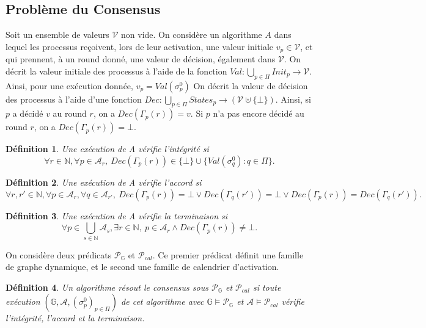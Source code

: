 \documentclass{article}
\newtheorem{definition}{Définition}
\begin{document}
\subsection{Problème du Consensus}

	Soit un ensemble de valeurs $\mathcal{V}$ non vide.
	On considère un algorithme $A$ dans lequel les processus reçoivent, lors de leur activation, une valeur initiale $v_p \in \mathcal{V}$,
	et qui prennent, à un round donné, une valeur de décision, également dans $\mathcal{V}$.
	On décrit la valeur initiale des processus à l'aide de la fonction $Val : \bigcup\limits_{p \in \Pi} Init_p  \rightarrow \mathcal{V}$.
	Ainsi, pour une exécution donnée, $v_p = Val(\sigma_p^0)$
	On décrit la valeur de décision des processus à l'aide d'une fonction
	$Dec : \bigcup\limits_{p \in \Pi} States_p  \rightarrow (\mathcal{V} \uplus \{\bot\})$.
	Ainsi, si $p$ a décidé $v$ au round $r$, on a $Dec(\Gamma_p(r)) = v$. Si $p$ n'a pas encore décidé au round $r$, on a $Dec(\Gamma_p(r)) = \bot$.

\begin{definition}
	Une exécution de A \emph{vérifie  l'intégrité} si 
	$$ \forall r \in \mathds{N},\forall p \in \mathcal{A}_{r}, \ Dec(\Gamma_p(r)) \in \{ \bot \} \cup  \{ Val(\sigma^0_q) :  q \in \Pi \}  .$$
\end{definition}

\begin{definition}
	Une exécution de A  \emph{vérifie l'accord} si
	$$\forall r, r'  \in \mathds{N}, \forall p \in \mathcal{A}_{r}, \forall q \in \mathcal{A}_{r'}, 
		\ Dec(\Gamma_p(r)) = \bot \vee Dec(\Gamma_q(r')) = \bot \vee Dec(\Gamma_p(r)) = Dec(\Gamma_q(r')) .$$
\end{definition}

\begin{definition}
	Une exécution de A \emph{vérifie la terminaison} si
	$$ \forall p \in \bigcup\limits_{s \in \mathds{N}} \mathcal{A}_s, \exists r \in \mathds{N}, \ 
		p \in \mathcal{A}_r \wedge Dec(\Gamma_p(r)) \neq \bot .  $$
\end{definition}

On considère deux prédicats $\mathcal{P}_{\mathds{G}}$ et $\mathcal{P}_{cal}$.
Ce premier prédicat définit une famille de graphe dynamique, et le second une famille de calendrier d'activation.
	
\begin{definition}\label{def:resforte}
	Un algorithme \emph{résout le consensus sous $\mathcal{P}_{\mathds{G}}$ et $\mathcal{P}_{cal}$} si toute exécution 
	$( \mathds{G} ,  \mathcal{A} , (\sigma^0_p)_{p \in \Pi})$    de cet algorithme
	avec $ \mathds{G} \models \mathcal{P}_{\mathds{G}}$ et $\mathcal{A}	\models \mathcal{P}_{cal}$  vérifie l'intégrité, l'accord et la terminaison.
\end{definition}
\end{document}
